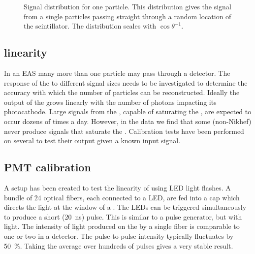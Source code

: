 \begin{figure}
    \centering
    
    \caption{Signal distribution for one particle. This distribution gives the signal from a single particles passing straight through a random location of the scintillator. The distribution scales with $\cos{\theta}^{-1}$.}
    \label{fig:signal_efficiency}
\end{figure}


\subsection{\pmt linearity}

In an EAS many more than one particle may pass through a detector. The response of the \pmt to different signal sizes needs to be investigated to determine the accuracy with which the number of particles can be reconstructed. Ideally the output of the \pmt grows linearly with the number of photons impacting its photocathode. Large signals from the \pmt, capable of saturating the \adc, are expected to occur dozens of times a day. However, in the data we find that some (non-Nikhef) \pmts never produce signals that saturate the \adc. Calibration tests have been performed on several \pmts to test their output given a known input signal.


\subsection{PMT calibration}
\label{sub:pmt_calibration}

A setup has been created to test the linearity of \pmts using LED light flashes. A bundle of 24 optical fibers, each connected to a LED, are fed into a cap which directs the light at the window of a \pmt. The LEDs can be triggered simultaneously to produce a short (\SI{20}{\ns}) pulse. This is similar to a pulse generator, but with light. The intensity of light produced on the \pmt by a single fiber is comparable to one or two \mip in a detector. The pulse-to-pulse intensity typically fluctuates by \SI{50}{\percent}. Taking the average over hundreds of pulses gives a very stable result.

